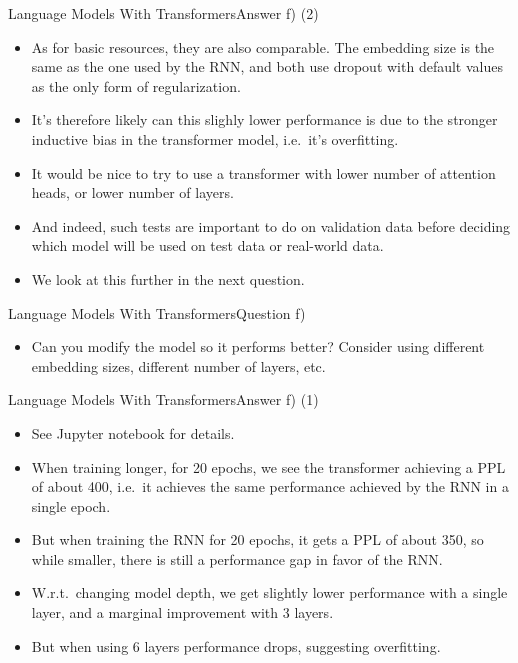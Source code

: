 \documentclass[t]{beamer}
\begin{document}
\begin{frame}{Language Models With Transformers}{Answer f) (2)}
    \begin{itemize}
        \item As for basic resources, they are also comparable.
              The embedding size is the same as the one used by the RNN, and
              both use dropout with default values as the only form of
              regularization.
        \item It's therefore likely can this slighly lower performance is due to
              the stronger inductive bias in the transformer model, i.e.\ it's
              overfitting.
        \item It would be nice to try to use a transformer with lower number of
              attention heads, or lower number of layers.
        \item And indeed, such tests are important to do on validation data
              before deciding which model will be used on test data or
              real-world data.
        \item We look at this further in the next question.
    \end{itemize}
\end{frame}

\begin{frame}{Language Models With Transformers}{Question f)}
    \begin{itemize}
        \item Can you modify the model so it performs better? Consider using
              different embedding sizes, different number of layers, etc.
    \end{itemize}
\end{frame}

\begin{frame}{Language Models With Transformers}{Answer f) (1)}
    \begin{itemize}
        \item See Jupyter notebook for details.
        \item When training longer, for 20 epochs, we see the transformer
              achieving a PPL of about 400, i.e.\ it achieves the same
              performance achieved by the RNN in a single epoch.
        \item But when training the RNN for 20 epochs, it gets a PPL of about
              350, so while smaller, there is still a performance gap in favor
              of the RNN.
        \item W.r.t.\ changing model depth, we get slightly lower performance
              with a single layer, and a marginal improvement with 3 layers.
        \item But when using 6 layers performance drops, suggesting overfitting.
    \end{itemize}
\end{frame}
\end{document}
